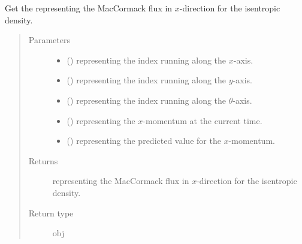 \documentclass[letterpaper,10pt,english]{sphinxmanual}
\begin{document}
\begin{fulllineitems}
\begin{fulllineitems}
\label{\detokenize{api:dycore.flux_isentropic.FluxIsentropicMacCormack._get_maccormack_flux_x_density}}
Get the  representing the MacCormack flux in \(x\)-direction for the
isentropic density.
\begin{quote}\begin{description}
\item[{Parameters}] \leavevmode\begin{itemize}
\item {} 
 () \textendash{}  representing the index running along the \(x\)-axis.

\item {} 
 () \textendash{}  representing the index running along the \(y\)-axis.

\item {} 
 () \textendash{}  representing the index running along the \(\theta\)-axis.

\item {} 
 () \textendash{}  representing the \(x\)-momentum at the current time.

\item {} 
 () \textendash{}  representing the predicted value for the \(x\)-momentum.

\end{itemize}

\item[{Returns}] \leavevmode
{} representing the MacCormack flux in \(x\)-direction for the isentropic density.

\item[{Return type}] \leavevmode
obj

\end{description}\end{quote}

\end{fulllineitems}


\end{fulllineitems}
\end{document}
